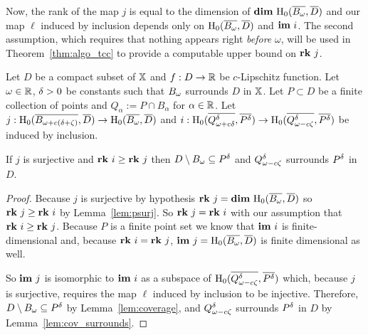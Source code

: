 Now, the rank of the map $j$ is equal to the dimension of $\mathbf{dim}~\mathrm{H}_0(\overline{B_\omega}, \overline{D})$ and our map $\ell$ induced by inclusion depends only on $\mathrm{H}_0(\overline{B_\omega}, \overline{D})$ and $\mathbf{im}~i$.
The second assumption, which requires that nothing appears right \emph{before} $\omega$, will be used in Theorem~\ref{thm:algo_tcc} to provide a computable upper bound on $\mathbf{rk}~j$.

\begin{theorem}\label{thm:geo_tcc}
  Let $D$ be a compact subset of $\mathbb{X}$ and $f : D\to\mathbb{R}$ be $c$-Lipschitz function.
  Let $\omega\in\mathbb{R}$, ${\delta} > 0$ be constants such that $B_{\omega}$ surrounds $D$ in $\mathbb{X}$.
  Let $P\subset D$ be a finite collection of points and $Q_\alpha := P\cap B_\alpha$ for $\alpha\in\mathbb{R}$.
  Let $j : \mathrm{H}_0(\overline{B_{\omega+c(\delta+\zeta)}},\overline{D})\to \mathrm{H}_0(\overline{B_{\omega}},\overline{D})$ and $i : \mathrm{H}_0(\overline{Q_{\omega + c{\delta}}^{\delta}}, \overline{P^{\delta}})\to \mathrm{H}_0(\overline{Q_{\omega - c\zeta}^{\delta}}, \overline{P^{\delta}})$ be induced by inclusion.

  If $j$ is surjective and $\mathbf{rk}~i\geq \mathbf{rk}~j$ then $D\setminus B_{\omega}\subseteq P^{\delta}$ and $Q_{\omega - c\zeta}^{\delta}$ surrounds $P^{\delta}$ in $D$.
\end{theorem}
\begin{proof}
  Because $j$ is surjective by hypothesis $\mathbf{rk}~j = \mathbf{dim}~\mathrm{H}_0(\overline{B_{\omega}},\overline{D})$ so $\mathbf{rk}~j\geq \mathbf{rk}~i$ by Lemma~\ref{lem:psurj}.
  So $\mathbf{rk}~j = \mathbf{rk}~i$ with our assumption that $\mathbf{rk}~i\geq \mathbf{rk}~j$.
  Because $P$ is a finite point set we know that $\mathbf{im}~i$ is finite-dimensional and, because $\mathbf{rk}~i = \mathbf{rk}~j$, $\mathbf{im}~j=\mathrm{H}_0(\overline{B_{\omega}}, \overline{D})$ is finite dimensional as well.

  So $\mathbf{im}~j$ is isomorphic to $\mathbf{im}~i$ as a subspace of $\mathrm{H}_0(\overline{Q_{\omega - c\zeta}^{\delta}}, \overline{P^{\delta}})$ which, because $j$ is surjective, requires the map $\ell$ induced by inclusion to be injective.
  Therefore, $D\setminus B_\omega\subseteq P^{\delta}$ by Lemma~\ref{lem:coverage}, and $Q_{\omega - c\zeta}^{\delta}$ surrounds $P^{\delta}$ in $D$ by Lemma~\ref{lem:cov_surrounds}.
\end{proof}
